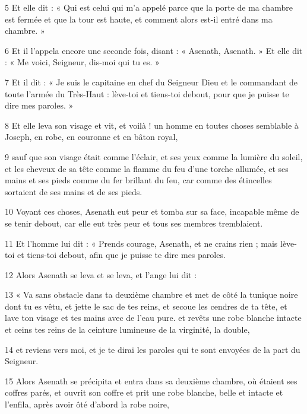 \par 5 Et elle dit : « Qui est celui qui m'a appelé parce que la porte de ma chambre est fermée et que la tour est haute, et comment alors est-il entré dans ma chambre. »

\par 6 Et il l'appela encore une seconde fois, disant : « Asenath, Asenath. » Et elle dit : « Me voici, Seigneur, dis-moi qui tu es. »

\par 7 Et il dit : « Je suis le capitaine en chef du Seigneur Dieu et le commandant de toute l'armée du Très-Haut : lève-toi et tiens-toi debout, pour que je puisse te dire mes paroles. »

\par 8 Et elle leva son visage et vit, et voilà ! un homme en toutes choses semblable à Joseph, en robe, en couronne et en bâton royal,

\par 9 sauf que son visage était comme l'éclair, et ses yeux comme la lumière du soleil, et les cheveux de sa tête comme la flamme du feu d'une torche allumée, et ses mains et ses pieds comme du fer brillant du feu, car comme des étincelles sortaient de ses mains et de ses pieds.

\par 10 Voyant ces choses, Asenath eut peur et tomba sur sa face, incapable même de se tenir debout, car elle eut très peur et tous ses membres tremblaient.

\par 11 Et l'homme lui dit : « Prends courage, Asenath, et ne crains rien ; mais lève-toi et tiens-toi debout, afin que je puisse te dire mes paroles.

\par 12 Alors Asenath se leva et se leva, et l'ange lui dit :

\par 13 « Va sans obstacle dans ta deuxième chambre et met de côté la tunique noire dont tu es vêtu, et jette le sac de tes reins, et secoue les cendres de ta tête, et lave ton visage et tes mains avec de l'eau pure. et revêts une robe blanche intacte et ceins tes reins de la ceinture lumineuse de la virginité, la double,

\par 14 et reviens vers moi, et je te dirai les paroles qui te sont envoyées de la part du Seigneur.

\par 15 Alors Asenath se précipita et entra dans sa deuxième chambre, où étaient ses coffres parés, et ouvrit son coffre et prit une robe blanche, belle et intacte et l'enfila, après avoir ôté d'abord la robe noire,

